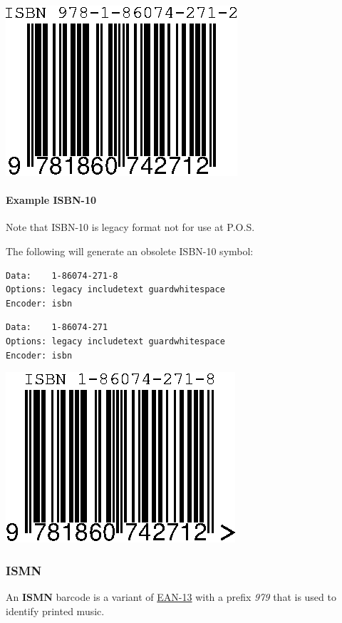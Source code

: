 \includegraphics{images/isbn-3.eps}

\hypertarget{example-isbn-10}{%
\paragraph{Example ISBN-10}\label{example-isbn-10}}

Note that ISBN-10 is legacy format not for use at P.O.S.

The following will generate an obsolete ISBN-10 symbol:

\begin{verbatim}
Data:    1-86074-271-8
Options: legacy includetext guardwhitespace
Encoder: isbn
\end{verbatim}

\begin{verbatim}
Data:    1-86074-271
Options: legacy includetext guardwhitespace
Encoder: isbn
\end{verbatim}

\includegraphics{images/isbn-4.eps}

\hypertarget{ismn}{%
\subsubsection{ISMN}\label{ismn}}

An \textbf{ISMN} barcode is a variant of
\protect\hyperlink{ean-13}{EAN-13} with a prefix \emph{979} that is used
to identify printed music.

